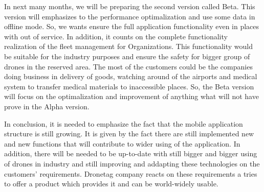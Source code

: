 In next many months, we will be preparing the second version called Beta. %
This version will emphasizes to the performance optimalization and use some data in offline mode. %
So, we wants ensure the full application functionality even in places with out of service. %
In addition, it counts on the complete functionality realization of the fleet management for Organizations. %
This functionality would be suitable for the industry purposes and ensure the safety for bigger group of drones in the reserved area.
The most of the customers could be the companies doing business in delivery of goods, watching around of the airports and medical system to transfer medical materials to inaccessible places.
So, the Beta version will focus on the optimalization and improvement of anything what will not have prove in the Alpha version.  %

In conclusion, it is needed to emphasize the fact that the mobile application structure is still growing. %
It is given by the fact there are still implemented new and new functions that will contribute to wider using of the application. %
In addition, there will be needed to be up-to-date with still bigger and bigger using of drones in industry and still improving and addapting these technologies on the customers' requirements.
Dronetag company reacts on these requirements a tries to offer a product which provides it and can be world-widely usable.
